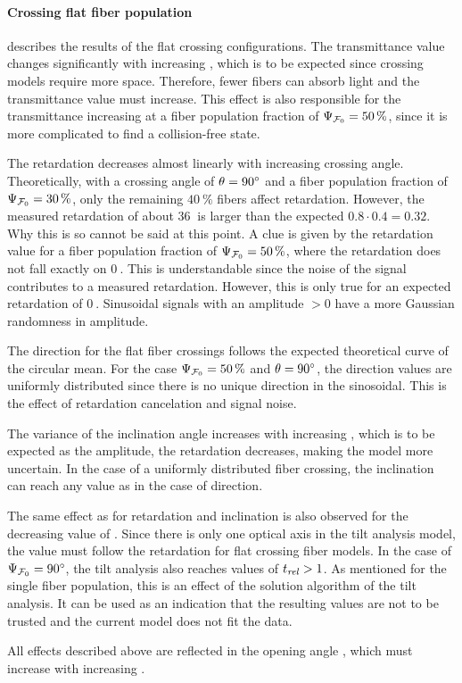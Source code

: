 \paragraph{Crossing flat fiber population}
 describes the results of the flat crossing configurations.
The transmittance value changes significantly with increasing \modelOmega{}, which is to be expected since crossing models require more space.
Therefore, fewer fibers can absorb light and the transmittance value must increase.
This effect is also responsible for the transmittance increasing at a fiber population fraction of $\textnormal{$\Psi_{\textnormal{$\mathcal{F}_0$}}$}=\SI{50}{\percent}$, since it is more complicated to find a collision-free state.
\par
%
The retardation decreases almost linearly with increasing crossing angle.
Theoretically, with a crossing angle of $\textnormal{$\theta$}=\SI{90}{\degree}$ and a fiber population fraction of $\textnormal{$\Psi_{\textnormal{$\mathcal{F}_0$}}$}=\SI{30}{\percent}$, only the remaining $\SI{40}{\percent}$ fibers affect retardation.
However, the measured retardation of about $\SI{36}{}$ is larger than the expected $0.8\cdot 0.4 = 0.32$.
Why this is so cannot be said at this point.
A clue is given by the retardation value for a fiber population fraction of $\textnormal{$\Psi_{\textnormal{$\mathcal{F}_0$}}$}=\SI{50}{\percent}$, where the retardation does not fall exactly on $\SI{0}{}$.
This is understandable since the noise of the signal contributes to a measured retardation.
However, this is only true for an expected retardation of $\SI{0}{}$.
Sinusoidal signals with an amplitude $>0$ have a more Gaussian randomness in amplitude.
\par
%
The direction for the flat fiber crossings follows the expected theoretical curve of the circular mean.
For the case $\textnormal{$\Psi_{\textnormal{$\mathcal{F}_0$}}$}=\SI{50}{\percent}$ and $\textnormal{$\theta$}=\SI{90}{\degree}$, the direction values are uniformly distributed since there is no unique direction in the sinosoidal.
This is the effect of retardation cancelation and signal noise.
\par
%
The variance of the inclination angle increases with increasing \modelOmega{}, which is to be expected as the amplitude, \ie{} the retardation decreases, making the model more uncertain.
In the case of a uniformly distributed fiber crossing, the inclination can reach any value as in the case of direction.
\par
%
The same effect as for retardation and inclination is also observed for the decreasing value of \trel{}.
Since there is only one optical axis in the tilt analysis model, the \trel{} value must follow the retardation for flat crossing fiber models.
In the case of $\textnormal{$\Psi_{\textnormal{$\mathcal{F}_0$}}$}=\SI{90}{\degree}$, the tilt analysis also reaches values of $\textnormal{$t_\mathit{rel}$}>1$.
As mentioned for the single fiber population, this is an effect of the solution algorithm of the tilt analysis.
It can be used as an indication that the resulting values are not to be trusted and the current model does not fit the data.
\par
%
All effects described above are reflected in the opening angle \openingAngle{}, which must increase with increasing \modelOmega{} .
%
%
%
